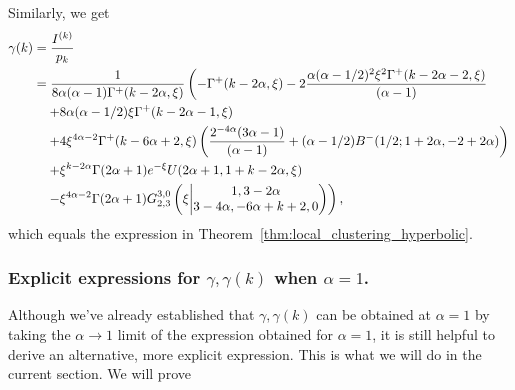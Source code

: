 Similarly, we get
\begin{align*}
	\gamma(k) &= \frac{I^{(k)}}{p_k} \\
	&=\frac{1}{8\alpha (\alpha-1)\Gamma^+(k-2\alpha,\xi)} \left( -\Gamma^+(k - 2 \alpha, \xi) 
		- 2\frac{\alpha (\alpha - 1/2)^2 \xi^{2} \Gamma^+(k - 2 \alpha - 2, \xi)}{(\alpha - 1)} \right. \\ 
	&\hspace{10pt}\left.+ 8 \alpha (\alpha - 1/2) \xi \Gamma^+(k - 2 \alpha - 1,\xi) \right.\\ 
	&\hspace{10pt}\left.+ 4\xi^{4\alpha - 2} \Gamma^+(k - 6 \alpha + 2, 
      \xi) \left( \frac{2^{ - 4\alpha}(3 \alpha - 1)}{(\alpha - 1)} + (\alpha - 1/2) B^-(1/2; 1 + 2 \alpha, -2 + 2 \alpha) \right)  \right.\\ 
	&\hspace{10pt}\left.+ \xi^{k-2\alpha} \Gamma(2\alpha+1)e^{-\xi} U(2\alpha+1,1+k-2\alpha,\xi) \right. \\ 
	&\hspace{10pt}\left.- \xi^{4\alpha-2} \Gamma(2\alpha+1)\MeijerGnew{3}{0}{2}{3}{1,3-2\alpha}{3-4\alpha,-6\alpha+k+2,0}{\xi}  \right),
\end{align*}
which equals the expression in Theorem~\ref{thm:local_clustering_hyperbolic}. %




\subsubsection{Explicit expressions for $\gamma, \gamma(k)$ when $\alpha=1$.}\label{ssec:alphais1}




Although we've already established that $\gamma, \gamma(k)$ can be obtained at $\alpha=1$ by
taking the $\alpha\to 1$ limit of the expression obtained for $\alpha=1$, it is still helpful
to derive an alternative, more explicit expression.
This is what we will do in the current section.
We will prove 

